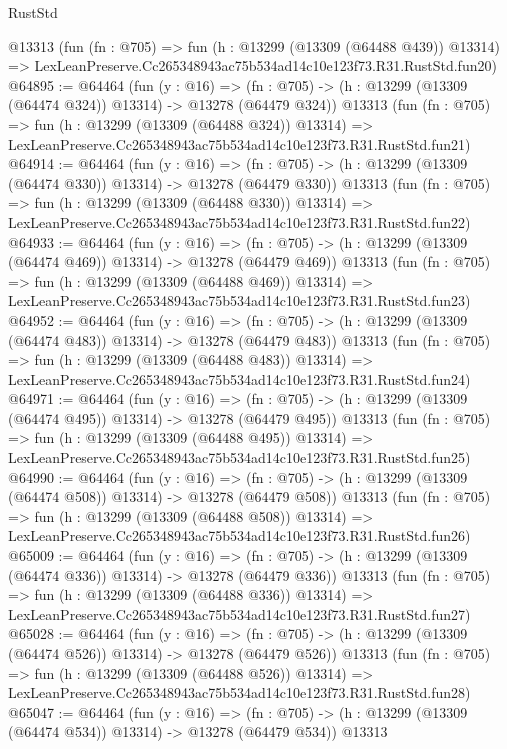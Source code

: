 \begin{lexlean}{RustStd}
\begin{coremodule}
    @13313
    (fun (fn : @705) =>
    fun (h : @13299 (@13309 (@64488 @439)) @13314) =>
    LexLeanPreserve.Cc265348943ac75b534ad14c10e123f73.R31.RustStd.fun20)
@64895 := @64464
    (fun (y : @16) =>
    (fn : @705) -> (h : @13299 (@13309 (@64474 @324)) @13314) -> @13278 (@64479 @324))
    @13313
    (fun (fn : @705) =>
    fun (h : @13299 (@13309 (@64488 @324)) @13314) =>
    LexLeanPreserve.Cc265348943ac75b534ad14c10e123f73.R31.RustStd.fun21)
@64914 := @64464
    (fun (y : @16) =>
    (fn : @705) -> (h : @13299 (@13309 (@64474 @330)) @13314) -> @13278 (@64479 @330))
    @13313
    (fun (fn : @705) =>
    fun (h : @13299 (@13309 (@64488 @330)) @13314) =>
    LexLeanPreserve.Cc265348943ac75b534ad14c10e123f73.R31.RustStd.fun22)
@64933 := @64464
    (fun (y : @16) =>
    (fn : @705) -> (h : @13299 (@13309 (@64474 @469)) @13314) -> @13278 (@64479 @469))
    @13313
    (fun (fn : @705) =>
    fun (h : @13299 (@13309 (@64488 @469)) @13314) =>
    LexLeanPreserve.Cc265348943ac75b534ad14c10e123f73.R31.RustStd.fun23)
@64952 := @64464
    (fun (y : @16) =>
    (fn : @705) -> (h : @13299 (@13309 (@64474 @483)) @13314) -> @13278 (@64479 @483))
    @13313
    (fun (fn : @705) =>
    fun (h : @13299 (@13309 (@64488 @483)) @13314) =>
    LexLeanPreserve.Cc265348943ac75b534ad14c10e123f73.R31.RustStd.fun24)
@64971 := @64464
    (fun (y : @16) =>
    (fn : @705) -> (h : @13299 (@13309 (@64474 @495)) @13314) -> @13278 (@64479 @495))
    @13313
    (fun (fn : @705) =>
    fun (h : @13299 (@13309 (@64488 @495)) @13314) =>
    LexLeanPreserve.Cc265348943ac75b534ad14c10e123f73.R31.RustStd.fun25)
@64990 := @64464
    (fun (y : @16) =>
    (fn : @705) -> (h : @13299 (@13309 (@64474 @508)) @13314) -> @13278 (@64479 @508))
    @13313
    (fun (fn : @705) =>
    fun (h : @13299 (@13309 (@64488 @508)) @13314) =>
    LexLeanPreserve.Cc265348943ac75b534ad14c10e123f73.R31.RustStd.fun26)
@65009 := @64464
    (fun (y : @16) =>
    (fn : @705) -> (h : @13299 (@13309 (@64474 @336)) @13314) -> @13278 (@64479 @336))
    @13313
    (fun (fn : @705) =>
    fun (h : @13299 (@13309 (@64488 @336)) @13314) =>
    LexLeanPreserve.Cc265348943ac75b534ad14c10e123f73.R31.RustStd.fun27)
@65028 := @64464
    (fun (y : @16) =>
    (fn : @705) -> (h : @13299 (@13309 (@64474 @526)) @13314) -> @13278 (@64479 @526))
    @13313
    (fun (fn : @705) =>
    fun (h : @13299 (@13309 (@64488 @526)) @13314) =>
    LexLeanPreserve.Cc265348943ac75b534ad14c10e123f73.R31.RustStd.fun28)
@65047 := @64464
    (fun (y : @16) =>
    (fn : @705) -> (h : @13299 (@13309 (@64474 @534)) @13314) -> @13278 (@64479 @534))
    @13313

\end{coremodule}
\end{lexlean}
